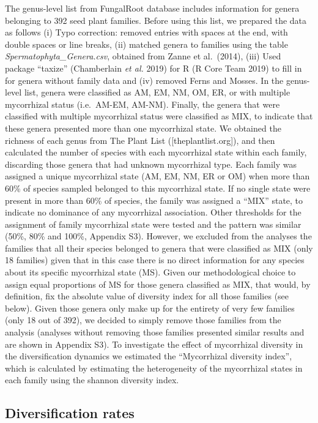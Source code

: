 \documentclass[12pt,]{article}
\begin{document}
The genus-level list from FungalRoot database includes information for
genera belonging to 392 seed plant families. Before using this list, we
prepared the data as follows (i) Typo correction: removed entries with
spaces at the end, with double spaces or line breaks, (ii) matched
genera to families using the table \emph{Spermatophyta\_Genera.csv},
obtained from Zanne et al.~(2014), (iii) Used package ``taxize''
(Chamberlain \emph{et al.} 2019) for R (R Core Team 2019) to fill in for
genera without family data and (iv) removed Ferns and Mosses. In the
genus-level list, genera were classified as AM, EM, NM, OM, ER, or with
multiple mycorrhizal status (i.e.~AM-EM, AM-NM). Finally, the genera
that were classified with multiple mycorrhizal status were classified as
MIX, to indicate that these genera presented more than one mycorrhizal
state. We obtained the richness of each genus from The Plant List
({[}theplantlist.org{]}), and then calculated the number of species with
each mycorrhizal state within each family, discarding those genera that
had unknown mycorrhizal type. Each family was assigned a unique
mycorrhizal state (AM, EM, NM, ER or OM) when more than 60\% of species
sampled belonged to this mycorrhizal state. If no single state were
present in more than 60\% of species, the family was assigned a ``MIX''
state, to indicate no dominance of any mycorrhizal association. Other
thresholds for the assignment of family mycorrhizal state were tested
and the pattern was similar (50\%, 80\% and 100\%, Appendix S3).
However, we excluded from the analyses the families that all their
species belonged to genera that were classified as MIX (only 18
families) given that in this case there is no direct information for any
species about its specific mycorrhizal state (MS). Given our
methodological choice to assign equal proportions of MS for those genera
classified as MIX, that would, by definition, fix the absolute value of
diversity index for all those families (see below). Given those genera
only make up for the entirety of very few families (only 18 out of 392),
we decided to simply remove those families from the analysis (analyses
without removing those families presented similar results and are shown
in Appendix S3). To investigate the effect of mycorrhizal diversity in
the diversification dynamics we estimated the ``Mycorrhizal diversity
index'', which is calculated by estimating the heterogeneity of the
mycorrhizal states in each family using the shannon diversity index.

\hypertarget{diversification-rates}{%
\subsection{Diversification rates}\label{diversification-rates}}
\end{document}
